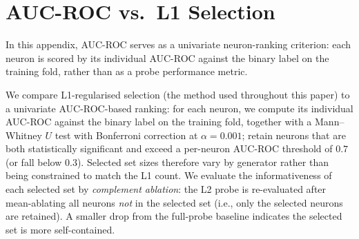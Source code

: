 \documentclass[11pt]{article}
\begin{document}
\section{AUC-ROC vs.\ L1 Selection}
\label{app:auc-l1}

In this appendix, AUC-ROC serves as a univariate neuron-ranking criterion: each neuron is scored by its individual AUC-ROC against the binary label on the training fold, rather than as a probe performance metric.

We compare L1-regularised selection (the method used throughout this paper) to a univariate AUC-ROC-based ranking: for each neuron, we compute its individual AUC-ROC against the binary label on the training fold, together with a Mann--Whitney $U$ test with Bonferroni correction at $\alpha=0.001$; retain neurons that are both statistically significant and exceed a per-neuron AUC-ROC threshold of $0.7$ (or fall below $0.3$). Selected set sizes therefore vary by generator rather than being constrained to match the L1 count. We evaluate the informativeness of each selected set by \emph{complement ablation}: the L2 probe is re-evaluated after mean-ablating all neurons \emph{not} in the selected set (i.e., only the selected neurons are retained). A smaller drop from the full-probe baseline indicates the selected set is more self-contained.

\begin{table}[!htbp]
\centering
\small
\caption{L1 vs.\ AUC-ROC selection: mean across 15 cells. $n$: neurons selected. Jaccard: overlap between the two selection sets. Drop: accuracy drop from baseline when complement is ablated (positive = degradation). Three regimes are visible: parsimony (GPT-4, MPT, Mistral, LLaMA: L1 selects far fewer neurons with equivalent or smaller drop), convergence (GPT-2, similar $n$ and similar drop), and reversal (Cohere: AUC-ROC selects fewer with smaller drop).}
\label{tab:auc-l1}
\end{table}
\end{document}
